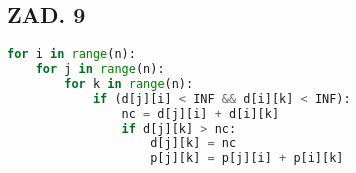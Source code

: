 \documentclass{article}
\begin{document}
    \subsection*{ZAD. 9}

\begin{lstlisting}[language=Python]
for i in range(n):
    for j in range(n):
        for k in range(n):
            if (d[j][i] < INF && d[i][k] < INF):
                nc = d[j][i] + d[i][k]
                if d[j][k] > nc:
                    d[j][k] = nc 
                    p[j][k] = p[j][i] + p[i][k]
            
\end{lstlisting}
\end{document}
